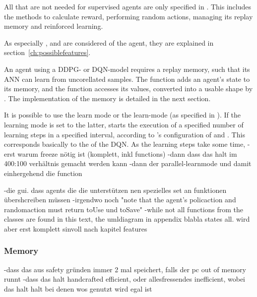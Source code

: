 All  that are not needed for supervised agents are only specified in . This includes the methods to calculate reward, performing random actions, managing its replay memory and reinforced learning.

As especially ,  and  are considered  of the agent, they are explained in section~\ref{ch:possiblefeatures}. 

An agent using a DDPG- or DQN-model requires a replay memory, such that its ANN can learn from uncorellated samples. The function  adds an agent's state to its memory, and the function  accesses its values, converted into a usable shape by . The implementation of the memory is detailed in the next section.

It is possible to use the  learn mode or the  learn-mode (as specified in ). If the learning mode is set to the latter,  starts the execution of a specified number of learning steps in a specified interval, according to 's configuration of  and . This corresponds basically to the  of the DQN\cite{mnih_human-level_2015}. As the learning steps take some time, 
-erst warum freeze nötig ist (komplett, inkl functions)
-dann dass das halt im 400:100 verhältnis gemacht werden kann
-dann der parallel-learnmode und damit einhergehend die   function

-die gui. dass agents die die unterstützen nen spezielles set an funktionen übershcreiben müssen
-irgendwo noch "note that the agent's policaction and randomaction must return toUse und toSave"
-while not all functions from the classes are found in this text, the umldiagram in appendix blabla states all. wird aber erst komplett sinvoll nach kapitel features

\subsubsection{Memory}

-dass das aus safety gründen immer 2 mal speichert, falls der pc out of memory runnt
-dass das halt handcrafted efficient, oder allesfressendes inefficient, wobei das halt halt bei denen wos genutzt wird egal ist

